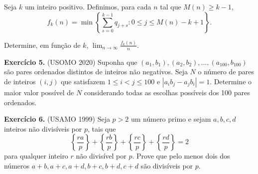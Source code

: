 \documentclass{hipatia}
\theoremstyle{definition} %
\begin{document}
Seja $k$ um inteiro positivo. Definimos, para cada $n$ tal que $M(n) \geq k - 1$,
$$
f_k(n) = \min \left\{ \sum_{s=0}^{k-1} q_{j+s} : 0 \leq j \leq M(n) - k + 1 \right\}.
$$

Determine, em função de $k$, $\lim_{n \to \infty} \frac{f_k(n)}{n}$.\vspace{0.2cm}

\noindent\textbf{Exercício 5.} (USOMO 2020) Suponha que $(a_1, b_1), (a_2, b_2), \dots, (a_{100}, b_{100})$ são pares ordenados distintos de inteiros não negativos. Seja $N$ o número de pares de inteiros $(i, j)$ que satisfazem $1 \leq i < j \leq 100$ e $|a_i b_j - a_j b_i| = 1$. Determine o maior valor possível de $N$ considerando todas as escolhas possíveis dos 100 pares ordenados.\vspace{0.2cm}

\noindent\textbf{Exercício 6.} (USAMO 1999) Seja $p > 2$ um número primo e sejam $a, b, c, d$ inteiros não divisíveis por $p$, tais que
$$
\left\{\frac{r a}{p}\right\} + \left\{\frac{r b}{p}\right\} + \left\{\frac{r c}{p}\right\} + \left\{\frac{r d}{p}\right\} = 2
$$
para qualquer inteiro $r$ não divisível por $p$. Prove que pelo menos dois dos números $a + b, a + c, a + d, b + c, b + d, c + d$ são divisíveis por $p$.
\end{document}
